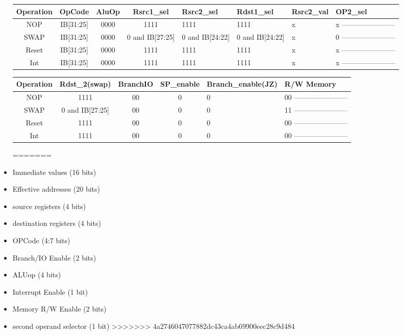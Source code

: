 \documentclass[12pt]{report}
\begin{document}
\begin{itemize}
        \begin{center}
        \begin{tabular}{||c| c| c| c| p{40mm}||} 
        \hline
        Operation & OpCode & AluOp & Rsrc1_sel & Rsrc2_sel & Rdst1_sel & Rsrc2_val & OP2_sel  \\ [0.5ex] 
        \hline\hline
        NOP & IB[31:25] & 0000 & 1111 & 1111 & 1111 & x & x ----------------------- \\
        \hline
        SWAP & IB[31:25] & 0000 & 0 and IB[27:25] & 0 and IB[24:22] & 0 and IB[24:22] & x & 0 ----------------------- \\
        \hline
        Reset & IB[31:25] & 0000 & 1111 & 1111 & 1111 & x & x ----------------------- \\
        \hline
        Int & IB[31:25] & 0000 & 1111 & 1111 & 1111 & x & x ----------------------- \\
        \hline
        \end{tabular}
        \end{center}

        \begin{center}
        \begin{tabular}{||c| c| c| c| p{40mm}||} 
        \hline
        Operation & Rdst_2(swap) & BranchIO & SP_enable & Branch_enable(JZ) & R/W Memory  \\ [0.5ex] 
        \hline\hline
        NOP & 1111 & 00 & 0 & 0 & 00 ----------------------- \\
        \hline
        SWAP & 0 and IB[27:25] & 00 & 0 & 0 & 11 ----------------------- \\
        \hline
        Reset & 1111 & 00 & 0 & 0 & 00 ----------------------- \\
        \hline
        Int & 1111 & 00 & 0 & 0 & 00 ----------------------- \\
        \hline
        \end{tabular}
        \end{center}


=======
    \item Immediate values (16 bits)
    \item Effective addresses (20 bits)
    \item source registers (4 bits)
    \item destination registers (4 bits)
    \item OPCode (4:7 bits)
    \item Branch/IO Enable (2 bits)
    \item ALUop (4 bits)
    \item Interrupt Enable (1 bit)
    \item Memory R/W Enable (2 bits)
    \item second operand selector (1 bit)
>>>>>>> 4a2746047077882dc43ca4ab69900eec28c9d484
\end{itemize}
\end{document}
